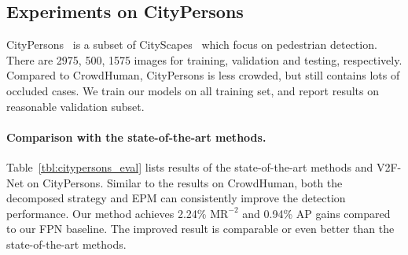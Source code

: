 \documentclass[10pt,twocolumn,letterpaper]{article}
\begin{document}
\subsection{Experiments on CityPersons}
CityPersons~\cite{zhang2017citypersons} is a subset of CityScapes~\cite{cordts2016cityscapes} which focus on pedestrian detection. There are 2975, 500, 1575 images for training, validation and testing, respectively. Compared to CrowdHuman, CityPersons is less crowded, but still contains lots of occluded cases. We train our models on all training set, and report results on reasonable validation subset.

\paragraph{Comparison with the state-of-the-art methods.} Table~\ref{tbl:citypersons_eval} lists results of the state-of-the-art methods and V2F-Net on CityPersons. Similar to the results on CrowdHuman, both the decomposed strategy and EPM can consistently improve the detection performance. Our method achieves 2.24\% $\text{MR}^{-2}$ and 0.94\% AP gains compared to our FPN baseline. The improved result is comparable or even better than the state-of-the-art methods.
\end{document}
